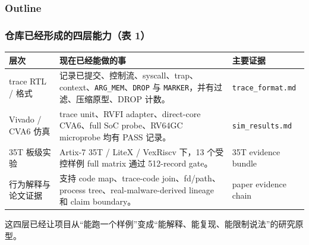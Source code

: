 \documentclass[aspectratio=169,10pt]{beamer}
\begin{document}
\begin{frame}
  \frametitle{Outline}
  \vskip0.4cm
  \tableofcontents[currentsection]
\end{frame}

\begin{frame}
  \frametitle{仓库已经形成的四层能力（表 1）}
  \vskip0.1cm
  \begin{center}\scriptsize
  \renewcommand{\arraystretch}{1.22}
  \begin{tabularx}{0.96\linewidth}{@{}L{2.25cm}Y L{2.55cm}@{}}
    \toprule
    \textbf{层次} & \textbf{现在已经能做的事} & \textbf{主要证据} \\
    \midrule
    trace RTL / 格式 & 记录已提交、控制流、syscall、trap、context、\texttt{ARG\_MEM}、\texttt{DROP} 与 \texttt{MARKER}，并有过滤、压缩原型、DROP 计数。 & \texttt{trace\_format.md} \\
    Vivado / CVA6 仿真 & trace unit、RVFI adapter、direct-core CVA6、full SoC probe、RV64GC microprobe 均有 PASS 记录。 & \texttt{sim\_results.md} \\
    35T 板级实验 & Artix-7 35T / LiteX / VexRiscv 下，13 个受控样例 full matrix 通过 512-record gate。 & 35T evidence bundle \\
    行为解释与论文证据 & 支持 code map、trace-code join、fd/path、process tree、real-malware-derived lineage 和 claim boundary。 & paper evidence chain \\
    \bottomrule
  \end{tabularx}
  \end{center}

  \vskip0.12cm
  \small
  这四层已经让项目从“能跑一个样例”变成“能解释、能复现、能限制说法”的研究原型。
\end{frame}
\end{document}
